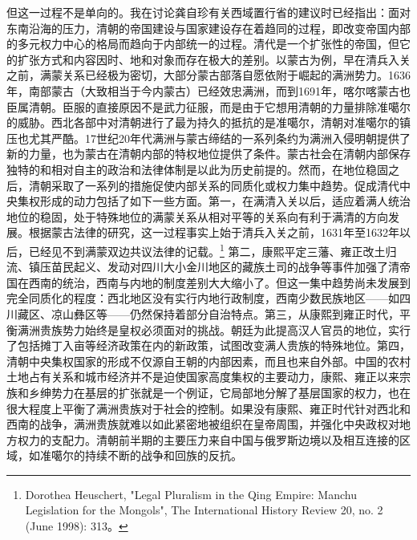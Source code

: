 \documentclass[a4paper, 12pt, openright]{ctexbook}
\begin{document}
但这一过程不是单向的。我在讨论龚自珍有关西域置行省的建议时已经指出：面对东南沿海的压力，清朝的帝国建设与国家建设存在着趋同的过程，即改变帝国内部的多元权力中心的格局而趋向于内部统一的过程。清代是一个扩张性的帝国，但它的扩张方式和内容因时、地和对象而存在极大的差别。以蒙古为例，早在清兵入关之前，满蒙关系已经极为密切，大部分蒙古部落自愿依附于崛起的满洲势力。1636年，南部蒙古（大致相当于今内蒙古）已经效忠满洲，而到1691年，喀尔喀蒙古也臣属清朝。臣服的直接原因不是武力征服，而是由于它想用清朝的力量排除准噶尔的威胁。西北各部中对清朝进行了最为持久的抵抗的是准噶尔，清朝对准噶尔的镇压也尤其严酷。17世纪20年代满洲与蒙古缔结的一系列条约为满洲入侵明朝提供了新的力量，也为蒙古在清朝内部的特权地位提供了条件。蒙古社会在清朝内部保存独特的和相对自主的政治和法律体制是以此为历史前提的。然而，在地位稳固之后，清朝采取了一系列的措施促使内部关系的同质化或权力集中趋势。促成清代中央集权形成的动力包括了如下一些方面。第一，在满清入关以后，适应着满人统治地位的稳固，处于特殊地位的满蒙关系从相对平等的关系向有利于满清的方向发展。根据蒙古法律的研究，这一过程事实上始于清兵入关之前，1631年至1632年以后，已经见不到满蒙双边共议法律的记载。\footnote{Dorothea Heuschert, "Legal Pluralism in the Qing Empire: Manchu Legislation for the Mongols", The International History Review 20, no. 2 (June 1998): 313。} 第二，康熙平定三藩、雍正改土归流、镇压苗民起义、发动对四川大小金川地区的藏族土司的战争等事件加强了清帝国在西南的统治，西南与内地的制度差别大大缩小了。但这一集中趋势尚未发展到完全同质化的程度：西北地区没有实行内地行政制度，西南少数民族地区——如四川藏区、凉山彝区等——仍然保持着部分自治特点。第三，从康熙到雍正时代，平衡满洲贵族势力始终是皇权必须面对的挑战。朝廷为此提高汉人官员的地位，实行了包括摊丁入亩等经济政策在内的新政策，试图改变满人贵族的特殊地位。第四，清朝中央集权国家的形成不仅源自王朝的内部因素，而且也来自外部。中国的农村土地占有关系和城市经济并不是迫使国家高度集权的主要动力，康熙、雍正以来宗族和乡绅势力在基层的扩张就是一个例证，它局部地分解了基层国家的权力，也在很大程度上平衡了满洲贵族对于社会的控制。如果没有康熙、雍正时代针对西北和西南的战争，满洲贵族就难以如此紧密地被组织在皇帝周围，并强化中央政权对地方权力的支配力。清朝前半期的主要压力来自中国与俄罗斯边境以及相互连接的区域，如准噶尔的持续不断的战争和回族的反抗。
\end{document}
